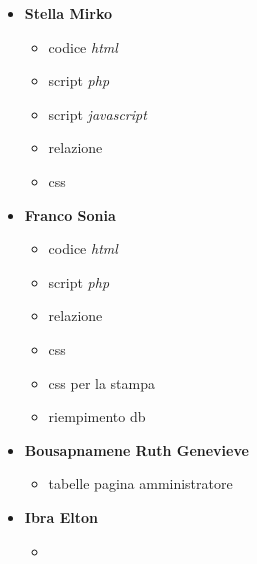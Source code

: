 \documentclass[a4paper]{article}
\begin{document}
\begin{itemize}
    \item [] \textbf{Stella Mirko}
    \begin{itemize}
        \item codice \textit{html}
        \item script \textit{php}
        \item script \textit{javascript}
        \item relazione
        \item css
    \end{itemize}
    \item [] \textbf{Franco Sonia}
    \begin{itemize}
        \item codice \textit{html}
        \item script \textit{php}
        \item relazione
        \item css
        \item css per la stampa
        \item riempimento db
    \end{itemize}
    \item [] \textbf{Bousapnamene Ruth Genevieve}
    \begin{itemize}
        \item tabelle pagina amministratore
    \end{itemize}
    \item [] \textbf{Ibra Elton}
    \begin{itemize}
        \item 
    \end{itemize}
\end{itemize}
\end{document}
